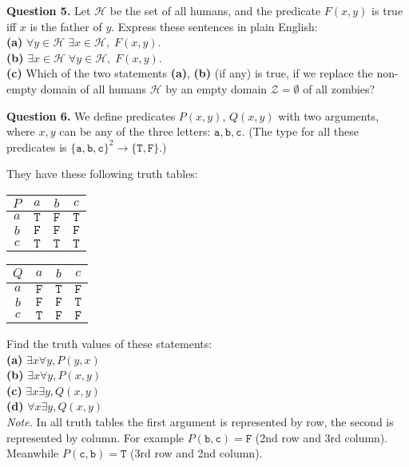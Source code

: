 \documentclass[jou]{apa6}
\begin{document}
\vspace{10pt}
{\bf Question 5.}
Let $\mathcal{H}$ be the set of all humans, and the predicate $F(x,y)$ is
true iff $x$ is the father of $y$. Express these sentences in plain English:\\
{\bf (a)} $\forall y \in \mathcal{H}\;\exists x \in \mathcal{H},\;F(x,y)$.\\
{\bf (b)} $\exists x \in \mathcal{H}\;\forall y \in \mathcal{H},\;F(x,y)$.\\
{\bf (c)} Which of the two statements {\bf (a)}, {\bf (b)} (if any) 
is true, if we replace the non-empty domain of all humans $\mathcal{H}$ by an
empty domain $\mathcal{Z} = \emptyset$ of all zombies?

\vspace{10pt}
{\bf Question 6.} We define predicates $P(x,y)$, 
$Q(x,y)$ with two arguments, 
where $x,y$ can be any of the three letters: 
$\mathtt{a},\mathtt{b},\mathtt{c}$. 
(The type for all these predicates is 
$\{ \mathtt{a},\mathtt{b},\mathtt{c} \}^2 
\rightarrow \{ \mathtt{T},\mathtt{F} \}$.)

They have these following truth tables:
\begin{center}
\begin{tabular}{c|ccc}
$P$ & $a$ & $b$ & $c$ \\ \hline
$a$ & $\mathtt{T}$ & $\mathtt{F}$ & $\mathtt{T}$ \\
$b$ & $\mathtt{F}$ & $\mathtt{F}$ & $\mathtt{F}$ \\
$c$ & $\mathtt{T}$ & $\mathtt{T}$ & $\mathtt{T}$
\end{tabular}
\hspace{2ex}
\begin{tabular}{c|ccc}
$Q$ & $a$ & $b$ & $c$ \\ \hline
$a$ & $\mathtt{F}$ & $\mathtt{T}$ & $\mathtt{F}$ \\
$b$ & $\mathtt{F}$ & $\mathtt{F}$ & $\mathtt{T}$ \\
$c$ & $\mathtt{T}$ & $\mathtt{F}$ & $\mathtt{F}$
\end{tabular}
\end{center}
Find the truth values of these statements:\\
{\bf (a)} $\exists x \forall y, P(y,x)$\\
{\bf (b)} $\exists x \forall y, P(x,y)$\\
{\bf (c)} $\exists x \exists y, Q(x,y)$\\
{\bf (d)} $\forall x \exists y, Q(x,y)$\\
{\em Note.} In all truth tables the first argument is
represented by row, the second is represented by column. 
For example $P(\mathtt{b}, \mathtt{c}) = \mathtt{F}$ (2nd row
and 3rd column). Meanwhile 
$P(\mathtt{c}, \mathtt{b}) = \mathtt{T}$ (3rd row and 2nd column). 
\end{document}
